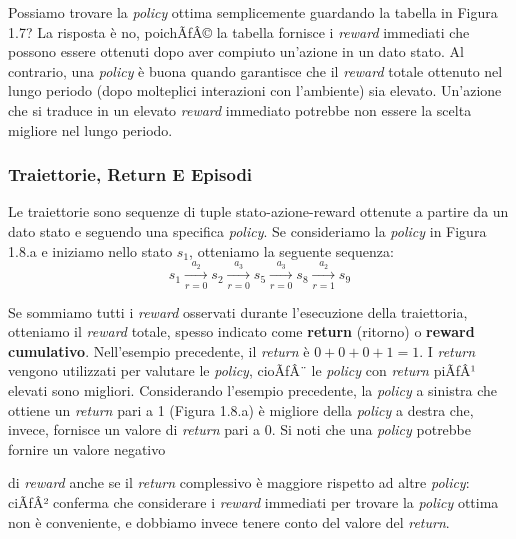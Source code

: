 ﻿\documentclass[11pt, a4paper]{report}
\begin{document}
Possiamo trovare la \emph{policy} ottima semplicemente guardando la tabella in Figura 1.7? La risposta è no, poichÃƒÂ© la tabella fornisce i \emph{reward} immediati che possono essere ottenuti dopo aver compiuto un'azione in un dato stato. Al contrario, una \emph{policy} è buona quando garantisce che il \emph{reward} totale ottenuto nel lungo periodo (dopo molteplici interazioni con l'ambiente) sia elevato. Un'azione che si traduce in un elevato \emph{reward} immediato potrebbe non essere la scelta migliore nel lungo periodo.

\subsubsection{Traiettorie, Return E Episodi}

Le traiettorie sono sequenze di tuple stato-azione-reward ottenute a partire da un dato stato e seguendo una specifica \emph{policy}. Se consideriamo la \emph{policy} in Figura 1.8.a e iniziamo nello stato $s_1$, otteniamo la seguente sequenza:
\begin{equation}
s_1 \xrightarrow[r=0]{a_2} s_2 \xrightarrow[r=0]{a_3} s_5 \xrightarrow[r=0]{a_3} s_8 \xrightarrow[r=1]{a_2} s_9
\end{equation}

Se sommiamo tutti i \emph{reward} osservati durante l'esecuzione della traiettoria, otteniamo il \emph{reward} totale, spesso indicato come \textbf{return} (ritorno) o \textbf{reward cumulativo}. Nell'esempio precedente, il \emph{return} è $0 + 0 + 0 + 1 = 1$. I \emph{return} vengono utilizzati per valutare le \emph{policy}, cioÃƒÂ¨ le \emph{policy} con \emph{return} piÃƒÂ¹ elevati sono migliori. Considerando l'esempio precedente, la \emph{policy} a sinistra che ottiene un \emph{return} pari a 1 (Figura 1.8.a) è migliore della \emph{policy} a destra che, invece, fornisce un valore di \emph{return} pari a 0. Si noti che una \emph{policy} potrebbe fornire un valore negativo

\newpage


di \emph{reward} anche se il \emph{return} complessivo è maggiore rispetto ad altre \emph{policy}: ciÃƒÂ² conferma che considerare i \emph{reward} immediati per trovare la \emph{policy} ottima non è conveniente, e dobbiamo invece tenere conto del valore del \emph{return}.
\end{document}
